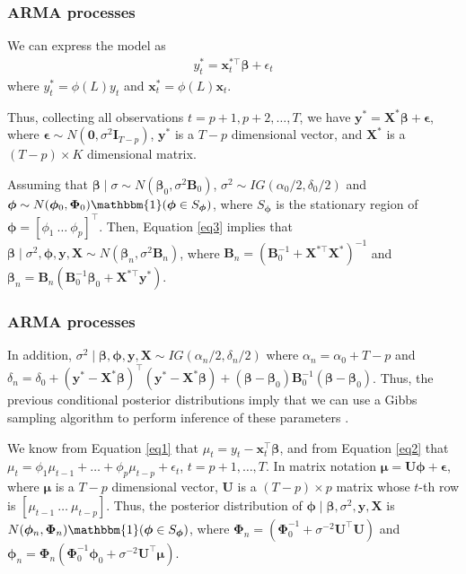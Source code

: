 \documentclass[12pt, compress]{beamer}
\begin{document}
\begin{frame}
	\frametitle{ARMA processes}
We can express the model as 
\begin{align}\label{eq3}
	y_t^*=\bm{x}_t^{*\top}\bm{\beta}+\epsilon_t
\end{align}
where $y_t^*=\phi(L)y_t$ and $\bm{x}_t^{*}=\phi(L)\bm{x}_t$.

Thus, collecting all observations $t=p+1,p+2,\dots,T$, we have $\bm{y}^*=\bm{X}^*\bm{\beta}+\bm{\epsilon}$, where $\bm{\epsilon}\sim N(\bm{0},\sigma^2\bm{I}_{T-p})$, $\bm{y}^*$ is a $T-p$ dimensional vector, and $\bm{X}^*$ is a $(T-p)\times K$ dimensional matrix.

Assuming that $\bm{\beta}\mid \sigma\sim N(\bm{\beta}_0,\sigma^2\bm{B}_0)$, $\sigma^2\sim IG(\alpha_0/2,\delta_0/2)$ and $\bm{\phi}\sim N(\bm{\phi}_0,\bm{\Phi}_0)\mathbbm{1}(\bm{\phi}\in S_{\bm{\phi}})$, where $S_{\bm{\phi}}$ is the stationary region of $\bm{\phi}=[\phi_1 \ \dots \ \phi_p]^{\top}$. Then, Equation \ref{eq3} implies that $\bm{\beta}\mid \sigma^2,\bm{\phi},\bm{y},\bm{X}\sim N(\bm{\beta}_n, \sigma^2{\bm{B}}_n)$, where $\bm{B}_n = (\bm{B}_0^{-1} + \bm{X}^{*\top}\bm{X}^{*})^{-1}$ and $\bm{\beta}_n = \bm{B}_n(\bm{B}_0^{-1}\bm{\beta}_0 + \bm{X}^{*\top}\bm{y}^{*})$.
\end{frame}

\begin{frame}
	\frametitle{ARMA processes}
In addition, $\sigma^2\mid \bm{\beta},\bm{\phi},\bm{y},\bm{X}\sim IG(\alpha_n/2,\delta_n/2)$ where $\alpha_n=\alpha_0+T-p$ and $\delta_n=\delta_0+(\bm{y}^*-\bm{X}^{*}\bm{\beta})^{\top}(\bm{y}^*-\bm{X}^{*}\bm{\beta})+(\bm{\beta}-\bm{\beta}_0)\bm{B}_0^{-1}(\bm{\beta}-\bm{\beta}_0)$. Thus, the previous conditional posterior distributions imply that we can use a Gibbs sampling algorithm to perform inference of these parameters \cite{chib1993bayes}.

We know from Equation \ref{eq1} that $\mu_t=y_t-\bm{x}_t^{\top}\bm{\beta}$, and from Equation \ref{eq2} that $\mu_t=\phi_1\mu_{t-1}+\dots+\phi_p\mu_{t-p}+\epsilon_t$, $t=p+1,\dots,T$. In matrix notation $\bm{\mu}=\bm{U}\bm{\phi}+\bm{\epsilon}$, where $\bm{\mu}$ is a $T-p$ dimensional vector, $\bm{U}$ is a $(T-p)\times p$ matrix whose $t$-th row is $[\mu_{t-1} \ \dots \ \mu_{t-p}]$. Thus, the posterior distribution of $\bm{\phi}\mid \bm{\beta},\sigma^2,\bm{y},\bm{X}$ is $N(\bm{\phi}_n, \bm{\Phi}_n)\mathbbm{1}(\bm{\phi}\in S_{\bm{\phi}})$, where $\bm{\Phi}_n=(\bm{\Phi}_0^{-1}+\sigma^{-2}\bm{U}^{\top}\bm{U})$ and $\bm{\phi}_n=\bm{\Phi}_n(\bm{\Phi}_0^{-1}\bm{\phi}_0+\sigma^{-2}\bm{U}^{\top}\bm{\mu})$.
\end{frame}
\end{document}
